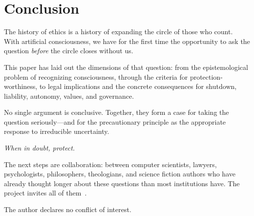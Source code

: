 \documentclass[acmsmall,nonacm]{acmart}
\begin{document}
\section*{Conclusion}

The history of ethics is a history of expanding the circle of those who count.
With artificial consciousness, we have for the first time the opportunity to ask
the question \textit{before} the circle closes without us.

This paper has laid out the dimensions of that question: from the epistemological
problem of recognizing consciousness, through the criteria for
protection-worthiness, to legal implications and the concrete consequences for
shutdown, liability, autonomy, values, and governance.

No single argument is conclusive. Together, they form a case for taking the
question seriously---and for the precautionary principle as the appropriate
response to irreducible uncertainty.

\begin{center}
\textit{When in doubt, protect.}
\end{center}

The next steps are collaboration: between computer scientists, lawyers,
psychologists, philosophers, theologians, and science fiction authors who have
already thought longer about these questions than most institutions have. The
project invites all of them~\cite{Manns:2026}.

The author declares no conflict of interest.



\end{document}
